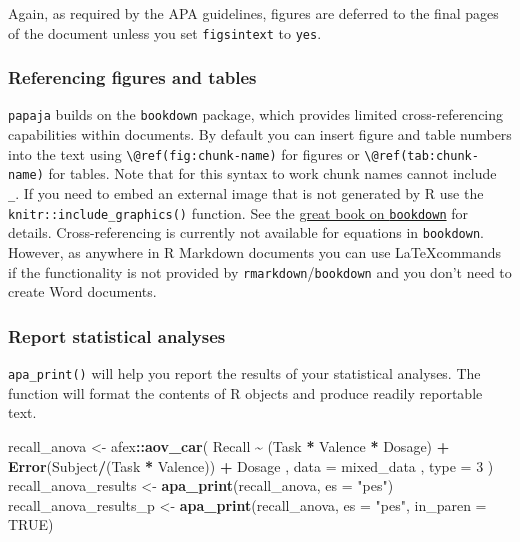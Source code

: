 \documentclass[
  man,floatsintext]{apa6}
\newenvironment{Shaded}{\begin{snugshade}}{\end{snugshade}}
\newcommand{\AttributeTok}[1]{\textcolor[rgb]{0.13,0.29,0.53}{#1}}
\newcommand{\ConstantTok}[1]{\textcolor[rgb]{0.56,0.35,0.01}{#1}}
\newcommand{\DecValTok}[1]{\textcolor[rgb]{0.00,0.00,0.81}{#1}}
\newcommand{\FunctionTok}[1]{\textcolor[rgb]{0.13,0.29,0.53}{\textbf{#1}}}
\newcommand{\NormalTok}[1]{#1}
\newcommand{\OtherTok}[1]{\textcolor[rgb]{0.56,0.35,0.01}{#1}}
\newcommand{\SpecialCharTok}[1]{\textcolor[rgb]{0.81,0.36,0.00}{\textbf{#1}}}
\newcommand{\StringTok}[1]{\textcolor[rgb]{0.31,0.60,0.02}{#1}}
\begin{document}
Again, as required by the APA guidelines, figures are deferred to the final pages of the document unless you set \texttt{figsintext} to \texttt{yes}.

\subsubsection{Referencing figures and tables}\label{referencing-figures-and-tables}

\texttt{papaja} builds on the \texttt{bookdown} package, which provides limited cross-referencing capabilities within documents.
By default you can insert figure and table numbers into the text using \texttt{\textbackslash{}@ref(fig:chunk-name)} for figures or \texttt{\textbackslash{}@ref(tab:chunk-name)} for tables.
Note that for this syntax to work chunk names cannot include \texttt{\_}.
If you need to embed an external image that is not generated by R use the \texttt{knitr::include\_graphics()} function.
See the \href{https://bookdown.org/yihui/bookdown/cross-references.html}{great book on \texttt{bookdown}} for details.
Cross-referencing is currently not available for equations in \texttt{bookdown}.
However, as anywhere in R Markdown documents you can use \LaTeX commands if the functionality is not provided by \texttt{rmarkdown}/\texttt{bookdown} and you don't need to create Word documents.

\subsubsection{Report statistical analyses}\label{report-statistical-analyses}

\texttt{apa\_print()} will help you report the results of your statistical analyses.
The function will format the contents of R objects and produce readily reportable text.

\begin{Shaded}
\begin{Highlighting}[]
\NormalTok{recall\_anova }\OtherTok{\textless{}{-}}\NormalTok{ afex}\SpecialCharTok{::}\FunctionTok{aov\_car}\NormalTok{(}
\NormalTok{  Recall }\SpecialCharTok{\textasciitilde{}}\NormalTok{ (Task }\SpecialCharTok{*}\NormalTok{ Valence }\SpecialCharTok{*}\NormalTok{ Dosage) }\SpecialCharTok{+} \FunctionTok{Error}\NormalTok{(Subject}\SpecialCharTok{/}\NormalTok{(Task }\SpecialCharTok{*}\NormalTok{ Valence)) }\SpecialCharTok{+}\NormalTok{ Dosage}
\NormalTok{  , }\AttributeTok{data =}\NormalTok{ mixed\_data}
\NormalTok{  , }\AttributeTok{type =} \DecValTok{3}
\NormalTok{)}
\NormalTok{recall\_anova\_results }\OtherTok{\textless{}{-}} \FunctionTok{apa\_print}\NormalTok{(recall\_anova, }\AttributeTok{es =} \StringTok{"pes"}\NormalTok{)}
\NormalTok{recall\_anova\_results\_p }\OtherTok{\textless{}{-}} \FunctionTok{apa\_print}\NormalTok{(recall\_anova, }\AttributeTok{es =} \StringTok{"pes"}\NormalTok{, }\AttributeTok{in\_paren =} \ConstantTok{TRUE}\NormalTok{)}
\end{Highlighting}
\end{Shaded}
\end{document}

